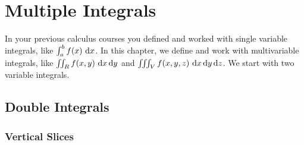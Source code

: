 

\graphicspath{{figures/integration/}}
\chapter{Multiple Integrals}

In your previous calculus courses you defined and worked
with single variable integrals, like $\int_a^b f(x)\ \dee{x}$. 
In this chapter, we define and work with multivariable integrals,
like $\dblInt_R f(x,y)\ \dee{x}\,\dee{y}$ and 
$\iiint_V f(x,y,z)\ \mathrm{d}x\,\mathrm{d}y\,\mathrm{d}z$. We start with two variable
integrals.

\section{Double Integrals}\label{sec 2d integrals}

\subsection{Vertical Slices}\label{sec_vertical_slices}

